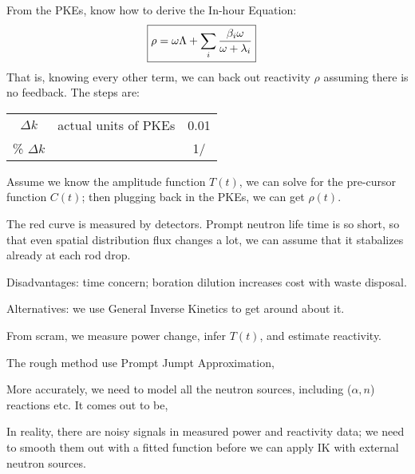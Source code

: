 \documentclass{school-22.211-notes}
\begin{document}



\clearpage
{}


From the PKEs, know how to derive the In-hour Equation: 
\begin{align}
\Aboxed{ \rho &= \omega \Lambda + \Sum_i \frac{\beta_i \omega}{\omega + \lambda_i}}
\end{align}
That is, knowing every other term, we can back out reactivity $\rho$ assuming there is no feedback. The steps are: 


\clearpage
{}
\begin{table}[ht]
  \centering
  \begin{tabular}{|c|c|c|}
    $\Delta k$ & actual units of PKEs & 0.01 \\
    \% $\Delta k$ & & 1/%
  \end{tabular}
\end{table}

\clearpage
{}
Assume we know the amplitude function $T(t)$, we can solve for the pre-cursor function $C(t)$; then plugging back in the PKEs, we can get $\rho(t)$. 



\clearpage
{}

The red curve is measured by detectors. Prompt neutron life time is so short, so that even spatial distribution flux changes a lot, we can assume that it stabalizes already at each rod drop. 

Disadvantages: time concern; boration dilution increases cost with waste disposal.  

Alternatives: we use General Inverse Kinetics to get around about it. 

From scram, we measure power change, infer $T(t)$, and estimate reactivity.

The rough method use Prompt Jumpt Approximation,


More accurately, we need to model all the neutron sources, including ($\alpha,n$) reactions etc. It comes out to be, 


In reality, there are noisy signals in measured power and reactivity data; we need to smooth them out with a fitted function before we can apply IK with external neutron sources. 
\end{document}
